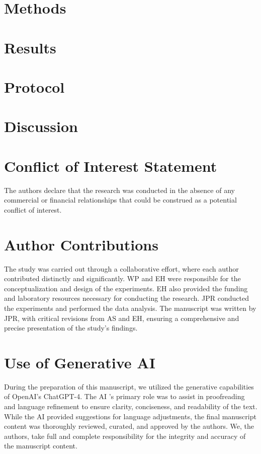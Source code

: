 \documentclass[utf8]{FrontiersinHarvard}
\begin{document}
    \section{Methods}
    


    \section{Results}
    


    \section{Protocol}
    


    \section{Discussion}
    

    \section*{Conflict of Interest Statement}
    The authors declare that the research was conducted in the absence of any commercial or financial relationships
    that could be construed as a potential conflict of interest.

    \section*{Author Contributions}
    The study was carried out through a collaborative effort, where each author contributed distinctly and
    significantly.
    WP and EH were responsible for the conceptualization and design of the experiments.
    EH also provided the funding and laboratory resources necessary for conducting the research.
    JPR conducted the experiments and performed the data analysis.
    The manuscript was written by JPR, with critical revisions from AS and EH, ensuring a comprehensive and precise
    presentation of the study's findings.

    \section*{Use of Generative AI}
    During the preparation of this manuscript, we utilized the generative capabilities of OpenAI's ChatGPT-4. The AI
    's primary role was to assist in proofreading and language refinement to ensure clarity, conciseness, and
    readability of the text. While the AI provided suggestions for language adjustments, the final manuscript content
    was thoroughly reviewed, curated, and approved by the authors. We, the authors, take full and complete
    responsibility for the integrity and accuracy of the manuscript content.
\end{document}
